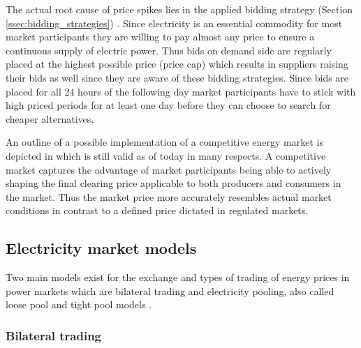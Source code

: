 The actual root cause of price spikes lies in the applied bidding strategy (Section \ref{ssec:bidding_strategies}) \cite{weron2007modeling}. Since electricity is an essential commodity for most market participants they are willing to pay almost any price to ensure a continuous supply of electric power. Thus bids on demand side are regularly placed at the highest possible price (price cap) which results in suppliers raising their bids as well since they are aware of these bidding strategies. Since bids are placed for all 24 hours of the following day market participants have to stick with high priced periods for at least one day before they can choose to search for cheaper alternatives. 




An outline of a possible implementation of a competitive energy market is depicted in \cite{hogan1993competitive} which is still valid as of today in many respects. A competitive market captures the advantage of market participants being able to actively shaping the final clearing price applicable to both producers and consumers in the market. Thus the market price more accurately resembles actual market conditions in contrast to a defined price dictated in regulated markets. 




\subsection{Electricity market models}

Two main models exist for the exchange and types of trading of energy prices in power markets which are bilateral trading and electricity pooling, also called loose pool and tight pool models \cite{onaiwu2009does,hogan1997reshaping,barroso2005classification,chao1999design}.

\subsubsection{Bilateral trading}

